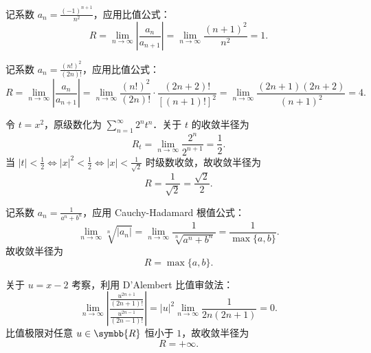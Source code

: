 \begin{solution}

    记系数 $a_n = \frac{(-1)^{n+1}}{n^2}$，应用比值公式：
    \begin{equation}
        R = \lim_{n\to\infty} \left| \frac{a_n}{a_{n+1}} \right| = \lim_{n\to\infty} \frac{(n+1)^2}{n^2} = 1.
    \end{equation}


    记系数 $a_n = \frac{(n!)^2}{(2n)!}$，应用比值公式：
    \begin{equation}
        R = \lim_{n\to\infty} \left| \frac{a_n}{a_{n+1}} \right| = \lim_{n\to\infty} \frac{(n!)^2}{(2n)!} \cdot \frac{(2n+2)!}{[(n+1)!]^2} = \lim_{n\to\infty} \frac{(2n+1)(2n+2)}{(n+1)^2} = 4.
    \end{equation}


    令 $t = x^2$，原级数化为 $\sum_{n=1}^\infty 2^n t^n$．关于 $t$ 的收敛半径为
    \begin{equation}
        R_t = \lim_{n\to\infty} \frac{2^n}{2^{n+1}} = \frac{1}{2}.
    \end{equation}
    当 $|t| < \frac{1}{2} \iff |x|^2 < \frac{1}{2} \iff |x| < \frac{1}{\sqrt{2}}$ 时级数收敛，故收敛半径为
    \begin{equation}
        R = \frac{1}{\sqrt{2}} = \frac{\sqrt{2}}{2}.
    \end{equation}


    记系数 $a_n = \frac{1}{a^n + b^n}$，应用 Cauchy-Hadamard 根值公式：
    \begin{equation}
        \lim_{n\to\infty} \sqrt[n]{|a_n|} = \lim_{n\to\infty} \frac{1}{\sqrt[n]{a^n + b^n}} = \frac{1}{\max\{a, b\}}.
    \end{equation}
    故收敛半径为
    \begin{equation}
        R = \max\{a, b\}.
    \end{equation}


    关于 $u = x - 2$ 考察，利用 D'Alembert 比值审敛法：
    \begin{equation}
        \lim_{n\to\infty} \left| \frac{\frac{u^{2n+1}}{(2n+1)!}}{\frac{u^{2n-1}}{(2n-1)!}} \right| = |u|^2 \lim_{n\to\infty} \frac{1}{2n(2n+1)} = 0.
    \end{equation}
    比值极限对任意 $u \in \symbb{R}$ 恒小于 $1$，故收敛半径为
    \begin{equation}
        R = +\infty.
    \end{equation}


\end{solution}
